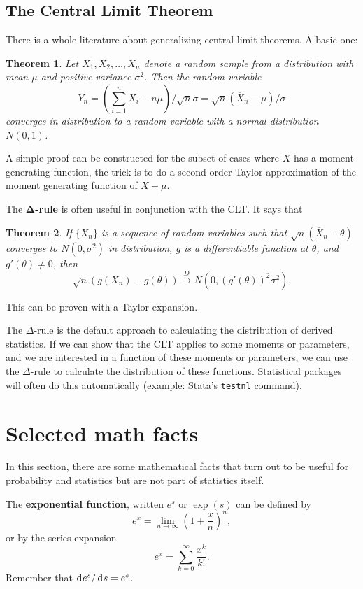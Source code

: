 \documentclass[10pt]{article}
\newtheorem{theorem}{Theorem}%
\begin{document}
\subsection{The Central Limit Theorem}
There is a whole literature about generalizing central limit theorems. A basic one:

\begin{theorem}
Let $X_1,X_2,\dots,X_n$ denote a random sample from a distribution with mean
$\mu$ and positive variance $\sigma^2$. Then the random variable \[ Y_n =
\left(\sum_{i=1}^n X_i - n\mu \right)/\sqrt{n}\sigma =
\sqrt{n}(\overline{X}_n-\mu)/\sigma\] converges in distribution to a random
variable with a normal distribution $N(0,1)$. 
\end{theorem}

A simple proof can be constructed for the subset of cases where $X$ has a moment generating
function, the trick is to do a second order Taylor-approximation of the moment generating
function of $X-\mu$. 

The $\mathbf{\Delta}$\textbf{-rule} is often useful in conjunction with the CLT.
It says that 

\begin{theorem}
If $\{X_n\}$ is a sequence of random variables such that $\sqrt{n}(\overline{X}_n-\theta)$
converges to $N(0,\sigma^2)$ in distribution, $g$ is a differentiable function at $\theta$,
and $g'(\theta)\neq 0$, then 
\[ \sqrt{n}\left(g(X_n) - g(\theta)\right) \xrightarrow{D} 
N\left(0, \left(g'(\theta)\right)^2\sigma^2\right).\]
\end{theorem}
This can be proven with a Taylor expansion. 

The $\Delta$-rule is the default approach to calculating the distribution of derived
statistics. If we can show that the CLT applies to some moments or parameters,
and we are interested in a function of these moments or parameters, we can use the 
$\Delta$-rule to calculate the distribution of these functions. Statistical packages
will often do this automatically (example: Stata's \texttt{testnl} command).

\section{Selected math facts}
In this section, there are some mathematical facts that turn out to be useful
for probability and statistics but are not part of statistics itself.

The \textbf{exponential function}, written $e^s$ or $\exp(s)$ can be defined by
\[ e^x = \lim_{n\rightarrow \infty} \left( 1 + \frac{x}{n} \right)^n, \]
or by the series expansion 
\[ e^x = \sum_{k=0}^\infty \frac{x^k}{k!}.\] 
Remember that $\rd e^s / \rd s =e^s$.
\end{document}
